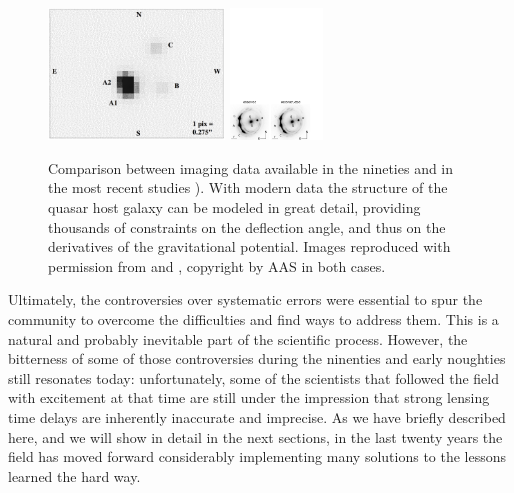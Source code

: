 \begin{figure}
\includegraphics[height=3.5cm]{figures/pg1115_blowup.png}
\includegraphics[height=3.5cm]{figures/Suyu14_fig1.pdf}
\caption{Comparison between imaging data available in the nineties
\citep[left panel, from][]{Sch++97} and in the most recent studies
\citep[middle and right panels, from][]{Suy++14}). With modern data the
structure of the quasar host galaxy can be modeled in great detail,
providing thousands of constraints on the deflection angle, and thus on
the derivatives of the gravitational potential.
Images reproduced with permission from \citet{Sch++97} and
\citet{Suy++14}, copyright by AAS in both cases.}
\label{fig:oldvsmodernimage}
\end{figure}

Ultimately, the controversies over systematic errors were essential to
spur the community to overcome the difficulties and find ways to
address them. This is a natural and probably inevitable part of the
scientific process. However, the bitterness of some of those
controversies during the ninenties and early noughties still resonates
today: unfortunately, some of the scientists that followed the field
with excitement at that time are still under the impression that
strong lensing time delays are inherently inaccurate and imprecise. As
we have briefly described here, and we will show in detail in the
next sections, in the last twenty years the field has moved forward
considerably implementing many solutions to the lessons learned the
hard way.
